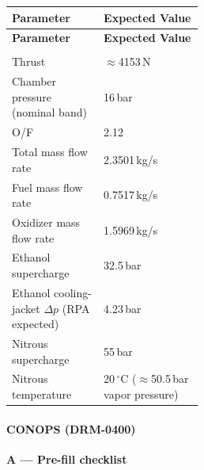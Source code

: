 \begin{xltabular}{\linewidth}{@{}>{\raggedright\arraybackslash}p{0.48\linewidth} X@{}}
\toprule
\textbf{Parameter} & \textbf{Expected Value} \\
\midrule
\endfirsthead
\toprule
\textbf{Parameter} & \textbf{Expected Value} \\
\midrule
\endhead
\midrule
{} \\
\endfoot
\bottomrule
\endlastfoot
Thrust & $\approx$4153\,N \\
  Chamber pressure (nominal band) & 16\,bar \\
  O/F & 2.12 \\
  Total mass flow rate & 2.3501\,kg/s \\
  Fuel mass flow rate & 0.7517\,kg/s \\
  Oxidizer mass flow rate & 1.5969\,kg/s \\
  Ethanol supercharge & 32.5\,bar \\
  Ethanol cooling-jacket $\Delta p$ (RPA expected) & 4.23\,bar \\
  Nitrous supercharge & 55\,bar \\
  Nitrous temperature & 20\,$^{\circ}$C ($\approx$50.5\,bar vapor pressure) \\
\end{xltabular}

\paragraph{CONOPS (DRM-0400)}

\medskip
\noindent\textbf{A --- Pre-fill checklist}

